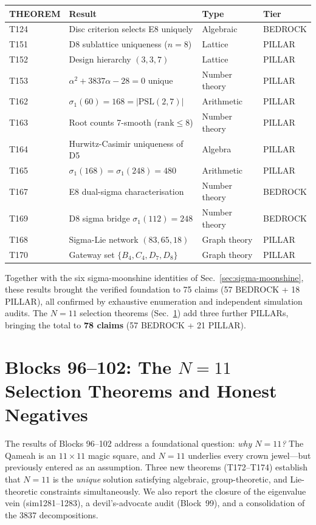 \documentclass[aps,prd,twocolumn,superscriptaddress,floatfix,nofootinbib]{revtex4-2}
\theoremstyle{definition}
\theoremstyle{remark}
\begin{document}
\begin{center}
\begin{tabular}{llll}
\toprule
THEOREM & Result & Type & Tier \\
\midrule
T124 & Disc criterion selects E8 uniquely
     & Algebraic & BEDROCK \\
T151 & D8 sublattice uniqueness ($n{=}8$)
     & Lattice & PILLAR \\
T152 & Design hierarchy $(3,3,7)$
     & Lattice & PILLAR \\
T153 & $\alpha^2 + 3837\alpha - 28 = 0$ unique
     & Number theory & PILLAR \\
T162 & $\sigma_1(60) = 168 = |\mathrm{PSL}(2,7)|$
     & Arithmetic & PILLAR \\
T163 & Root counts 7-smooth ($\mathrm{rank} \le 8$)
     & Number theory & PILLAR \\
T164 & Hurwitz-Casimir uniqueness of D5
     & Algebra & PILLAR \\
T165 & $\sigma_1(168) = \sigma_1(248) = 480$
     & Arithmetic & PILLAR \\
T167 & E8 dual-sigma characterisation
     & Number theory & BEDROCK \\
T169 & D8 sigma bridge $\sigma_1(112) = 248$
     & Number theory & BEDROCK \\
T168 & Sigma-Lie network $(83, 65, 18)$
     & Graph theory & PILLAR \\
T170 & Gateway set $\{B_4, C_4, D_7, D_8\}$
     & Graph theory & PILLAR \\
\bottomrule
\end{tabular}
\end{center}

\noindent
Together with the six sigma-moonshine identities of
Sec.~\ref{sec:sigma-moonshine}, these results brought the verified
foundation to 75 claims (57 BEDROCK + 18 PILLAR), all
confirmed by exhaustive enumeration and independent simulation audits.
The $N{=}11$ selection theorems (Sec.~\ref{sec:block96-102}) add three
further PILLARs, bringing the total to \textbf{78 claims}
(57 BEDROCK + 21 PILLAR).

\section{Blocks 96--102: The $N{=}11$ Selection Theorems and Honest Negatives}
\label{sec:block96-102}

The results of Blocks 96--102 address a foundational question: \emph{why
$N{=}11$?}  The Qameah is an $11\times11$ magic square, and $N{=}11$
underlies every crown jewel---but previously entered as an assumption.
Three new theorems (T172--T174) establish that $N{=}11$ is the
\emph{unique} solution satisfying algebraic, group-theoretic, and
Lie-theoretic constraints simultaneously.  We also report the closure of
the eigenvalue vein (sim1281--1283), a devil's-advocate audit
(Block~99), and a consolidation of the 3837 decompositions.
\end{document}
